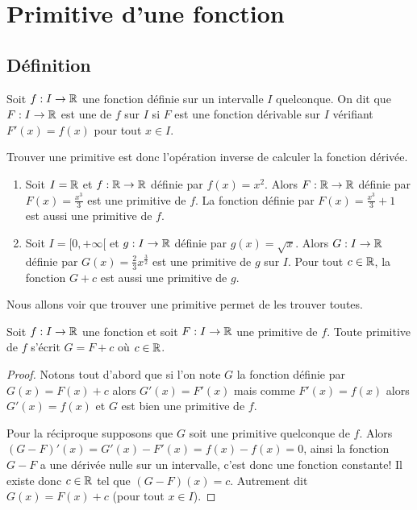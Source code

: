 \documentclass[class=report,crop=false]{standalone}
\begin{document}
\section{Primitive d'une fonction}
\label{sec:int3}

\subsection{Définition}

\begin{definition}
Soit $f:I \to \mathbb{R}$ une fonction définie sur un intervalle $I$ quelconque.
On dit que $F : I \to \mathbb{R}$ est une  de $f$ sur $I$ si
$F$ est une fonction dérivable sur $I$ vérifiant $F'(x)=f(x)$ pour tout $x \in I$.
\end{definition}
Trouver une primitive est donc l'opération inverse de calculer la fonction dérivée.

\begin{exemple}
\sauteligne
\begin{enumerate}
\item Soit $I=\mathbb{R}$ et $f: \mathbb{R} \to \mathbb{R}$ définie par $f(x) = x^2$.
Alors $F: \mathbb{R} \to \mathbb{R}$ définie par $F(x) = \frac{x^3}{3}$ est une primitive de $f$.
La fonction définie par $F(x)= \frac{x^3}{3}+1$ est aussi une primitive de $f$.

\item Soit $I=[0,+\infty[$ et $g : I\to\mathbb{R}$ définie par $g(x)=\sqrt x$.
Alors $G : I\to\mathbb{R}$ définie par $G(x)=\frac{2}{3} x^{\frac{3}{2}}$
est une primitive de $g$ sur $I$. Pour tout $c\in \mathbb{R}$, la fonction $G+c$
est aussi une primitive de $g$.
\end{enumerate}
\end{exemple}


Nous allons voir que trouver une primitive permet de les trouver toutes.
\begin{proposition}
\label{prop:primitunic}
Soit $f : I \to \mathbb{R}$ une fonction et soit $F : I \to \mathbb{R}$ une primitive de $f$.
Toute primitive de $f$ s'écrit $G=F+c$ où $c\in \mathbb{R}$.
\end{proposition}

\begin{proof}
Notons tout d'abord que si l'on note $G$ la fonction définie par $G(x)=F(x)+c$ alors
$G'(x)=F'(x)$ mais comme $F'(x)=f(x)$ alors $G'(x)=f(x)$ et $G$ est bien une primitive de $f$.

Pour la réciproque supposons que $G$ soit une primitive quelconque de $f$.
Alors $(G-F)'(x)=G'(x)-F'(x)=f(x)-f(x)=0$, ainsi
la fonction $G-F$ a une dérivée nulle sur un intervalle, c'est donc une fonction constante!
Il existe donc $c\in \mathbb{R}$ tel que $(G-F)(x)=c$. Autrement dit
$G(x)=F(x)+c$ (pour tout $x\in I$).
\end{proof}
\end{document}
